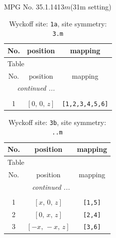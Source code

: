 \documentclass[fleqn,8pt]{jsarticle}
\begin{document}
\setcounter{MaxMatrixCols}{32}

\renewcommand{\tablename}{Table~}
\renewcommand{\figurename}{Figure~}
\begin{center}
\LARGE
MPG No. 35.1.141\quad$3m$\quad(31m setting)
\end{center}
\renewcommand{\arraystretch}{1.2}
\begin{longtable}{ccc}
\caption{Wyckoff site: {\tt 1a}, site symmetry: {\tt 3.m}}
 \\
 \hline \hline
No. & position & mapping \\ \hline \endfirsthead

\multicolumn{2}{l}{\tablename\ \thetable{}} \\
 \hline \hline
No. & position & mapping \\ \hline \endhead

 \hline \hline
\multicolumn{2}{r}{\footnotesize\it continued ...} \\ \endfoot

 \hline \hline
\multicolumn{2}{r}{} \\ \endlastfoot

1 & $\left[ 0,\, 0,\, z \right]$ & {\tt [1,2,3,4,5,6]} \\
\end{longtable}
\renewcommand{\arraystretch}{1.2}
\begin{longtable}{ccc}
\caption{Wyckoff site: {\tt 3b}, site symmetry: {\tt ..m}}
 \\
 \hline \hline
No. & position & mapping \\ \hline \endfirsthead

\multicolumn{2}{l}{\tablename\ \thetable{}} \\
 \hline \hline
No. & position & mapping \\ \hline \endhead

 \hline \hline
\multicolumn{2}{r}{\footnotesize\it continued ...} \\ \endfoot

 \hline \hline
\multicolumn{2}{r}{} \\ \endlastfoot

1 & $\left[ x,\, 0,\, z \right]$ & {\tt [1,5]} \\ \hline
2 & $\left[ 0,\, x,\, z \right]$ & {\tt [2,4]} \\ \hline
3 & $\left[ - x,\, - x,\, z \right]$ & {\tt [3,6]} \\
\end{longtable}
\renewcommand{\arraystretch}{1.2}
\end{document}
